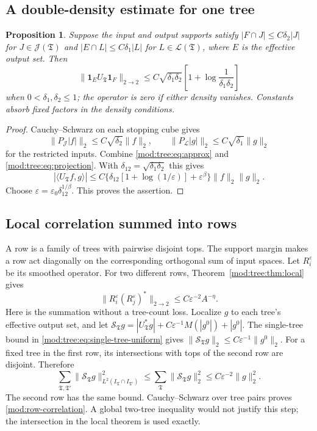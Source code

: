 \documentclass[11pt]{article}
\numberwithin{equation}{section}
\newtheorem{proposition}[theorem]{Proposition}
\theoremstyle{remark}
\theoremstyle{definition}
\newcommand{\TT}{\mathfrak T}
\begin{document}
\subsection{A double-density estimate for one tree}
\begin{proposition}\label{mod:double-density}
Suppose the input and output supports satisfy
$|F\cap J|\le C\delta_2|J|$ for $J\in\mathcal J(\TT)$ and
$|E\cap L|\le C\delta_1|L|$ for $L\in\mathcal L(\TT)$, where $E$ is the
effective output set. Then
\begin{equation}\label{mod:double-density-eq}
 \|\mathbf1_EU_\TT\mathbf1_F\|_{2\to2}
 \le C\sqrt{\delta_1\delta_2}
 \left[1+\log\frac1{\delta_1\delta_2}\right]
\end{equation}
when $0<\delta_1,\delta_2\le1$; the operator is zero if either density
vanishes. Constants absorb fixed factors in the density conditions.
\end{proposition}
\begin{proof}
Cauchy--Schwarz on each stopping cube gives
\[
 \|P_{\mathcal J}|f|\|_2\le C\sqrt{\delta_2}\|f\|_2,
 \qquad
 \|P_{\mathcal L}|g|\|_2\le C\sqrt{\delta_1}\|g\|_2
\]
for the restricted inputs. Combine
\eqref{mod:tree:eq:approx} and
\eqref{mod:tree:eq:projection}. With
$\delta_{12}=\sqrt{\delta_1\delta_2}$ this gives
\[
 |\langle U_\TT f,g\rangle|
 \le C\{\delta_{12}[1+\log(1/\varepsilon)]+\varepsilon^\beta\}
 \|f\|_2\|g\|_2.
\]
Choose $\varepsilon=\varepsilon_0\delta_{12}^{1/\beta}$. This proves the assertion.
\end{proof}

\subsection{Local correlation summed into rows}
A row is a family of trees with pairwise disjoint tops. The support
margin makes a row act diagonally on the corresponding orthogonal sum
of input spaces. Let $R_i^\varepsilon$ be its smoothed operator.
For two different rows, Theorem~\ref{mod:tree:thm:local} gives
\begin{equation}\label{mod:row-correlation}
 \|R_i^\varepsilon(R_j^\varepsilon)^*\|_{2\to2}
 \le C\varepsilon^{-2}A^{-\eta}.
\end{equation}
Here is the summation without a tree-count loss. Localize $g$ to each
tree's effective output set, and let
$\mathscr S_\TT g=|U_\TT^*g|+C\varepsilon^{-1}M(|g^0|)+|g^0|$.
The single-tree bound in \eqref{mod:tree:eq:single-tree-uniform} gives
$\|\mathscr S_\TT g\|_2\le C\varepsilon^{-1}\|g^0\|_2$.
For a fixed tree in the first row, its intersections with tops of the
second row are disjoint. Therefore
\[
 \sum_{\TT,\TT'}
 \|\mathscr S_\TT g\|_{L^2(I_\TT\cap I_{\TT'})}^2
 \le\sum_\TT\|\mathscr S_\TT g\|_2^2
 \le C\varepsilon^{-2}\|g\|_2^2.
\]
The second row has the same bound. Cauchy--Schwarz over tree pairs proves
\eqref{mod:row-correlation}. A global two-tree inequality would not
justify this step; the intersection in the local theorem is used exactly.
\end{document}
